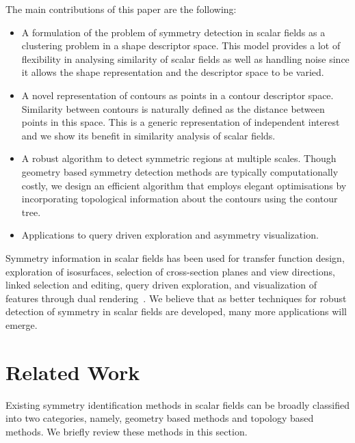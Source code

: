 \documentclass[review,journal]{vgtc}         %
\begin{document}
The main contributions of this paper are the following:
\begin{itemize}
\item A formulation of the problem of symmetry detection in scalar fields
as a clustering problem in a shape descriptor space. This model
provides a lot of flexibility in analysing similarity of scalar fields
as well as handling noise since it allows the shape representation and the 
descriptor space to be varied.
\item A novel representation of contours as points in a contour descriptor space.
Similarity between contours is naturally defined as the distance between points 
in this space. This is a generic representation of independent interest 
and we show its benefit in similarity analysis of scalar fields.
\item A robust algorithm to detect symmetric regions at multiple scales. Though geometry based 
symmetry detection methods are typically computationally costly, we design an efficient algorithm 
that employs elegant optimisations by incorporating topological information 
about the contours using the contour tree.
\item Applications to query driven exploration and asymmetry visualization.
\end{itemize}
Symmetry information in scalar fields
has been used for transfer function design, exploration of isosurfaces, selection of cross-section
planes and view directions, linked selection and editing, query driven exploration,
and visualization of features through dual rendering~\cite{ThomN11,HongS08,ThomN13,MasoodTN13}.
We believe that as better techniques for robust detection of symmetry in scalar fields are developed,
many more applications will emerge.
\section{Related Work}
Existing symmetry identification methods in scalar fields can be broadly classified into two
categories, namely, geometry based methods and topology based methods. We briefly review
these methods in this section.
\end{document}
